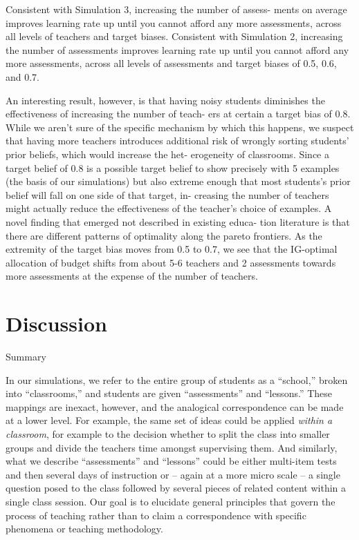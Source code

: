 \documentclass[10pt, letterpaper]{article}
\begin{document}
Consistent with Simulation 3, increasing the number of assess- ments on
average improves learning rate up until you cannot afford any more
assessments, across all levels of teachers and target biases. Consistent
with Simulation 2, increasing the number of assessments improves
learning rate up until you cannot afford any more assessments, across
all levels of assessments and target biases of 0.5, 0.6, and 0.7.

An interesting result, however, is that having noisy students diminishes
the effectiveness of increasing the number of teach- ers at certain a
target bias of 0.8. While we aren't sure of the specific mechanism by
which this happens, we suspect that having more teachers introduces
additional risk of wrongly sorting students' prior beliefs, which would
increase the het- erogeneity of classrooms. Since a target belief of 0.8
is a possible target belief to show precisely with 5 examples (the basis
of our simulations) but also extreme enough that most students's prior
belief will fall on one side of that target, in- creasing the number of
teachers might actually reduce the effectiveness of the teacher's choice
of examples. A novel finding that emerged not described in existing
educa- tion literature is that there are different patterns of
optimality along the pareto frontiers. As the extremity of the target
bias moves from 0.5 to 0.7, we see that the IG-optimal allocation of
budget shifts from about 5-6 teachers and 2 assessments towards more
assessments at the expense of the number of teachers.

\section{Discussion}\label{discussion}

Summary

In our simulations, we refer to the entire group of students as a
``school,'' broken into ``classrooms,'' and students are given
``assessments'' and ``lessons.'' These mappings are inexact, however,
and the analogical correspondence can be made at a lower level. For
example, the same set of ideas could be applied \emph{within a
classroom}, for example to the decision whether to split the class into
smaller groups and divide the teachers time amongst supervising them.
And similarly, what we describe ``assessments'' and ``lessons'' could be
either multi-item tests and then several days of instruction or -- again
at a more micro scale -- a single question posed to the class followed
by several pieces of related content within a single class session. Our
goal is to elucidate general principles that govern the process of
teaching rather than to claim a correspondence with specific phenomena
or teaching methodology.
\end{document}
